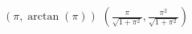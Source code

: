 { $\left( \pi, \arctan(\pi) \right)$ }
{ $\left( \frac{\pi}{\sqrt{1+\pi^2}}, \frac{\pi^2}{\sqrt{1+\pi^2}} \right)$ }

